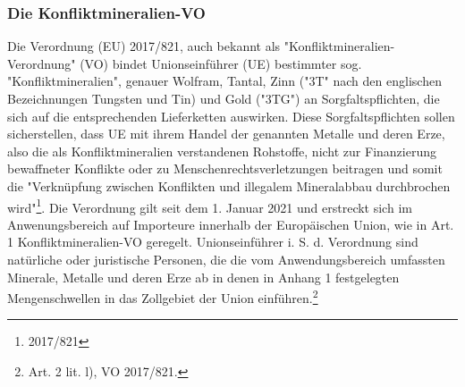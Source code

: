 \documentclass[12pt,a4paper,oneside]{book} %
\begin{document}
	\subsubsection{Die Konfliktmineralien-VO}
	Die Verordnung (EU) 2017/821, auch bekannt als "Konfliktmineralien-Verordnung" (VO) bindet Unionseinführer (UE) bestimmter sog. "Konfliktmineralien", genauer Wolfram, Tantal, Zinn ("3T" nach den englischen Bezeichnungen Tungsten und Tin) und Gold ("3TG") an Sorgfaltspflichten, die sich auf die entsprechenden Lieferketten auswirken. Diese Sorgfaltspflichten sollen sicherstellen, dass UE mit ihrem Handel der genannten Metalle und deren Erze, also die als Konfliktmineralien verstandenen Rohstoffe, nicht zur Finanzierung bewaffneter Konflikte oder zu Menschenrechtsverletzungen beitragen und somit die "Verknüpfung zwischen Konflikten und illegalem Mineralabbau durchbrochen wird"\footnote{2017/821}. Die Verordnung gilt seit dem 1. Januar 2021 und erstreckt sich im Anwenungsbereich auf Importeure innerhalb der Europäischen Union, wie in Art. 1 Konfliktmineralien-VO geregelt. Unionseinführer i. S. d. Verordnung sind natürliche oder juristische Personen, die die vom Anwendungsbereich umfassten Minerale, Metalle und deren Erze ab in denen in Anhang 1 festgelegten Mengenschwellen in das Zollgebiet der Union einführen.\footnote{Art. 2 lit. l), VO 2017/821.} 
	
\end{document}
